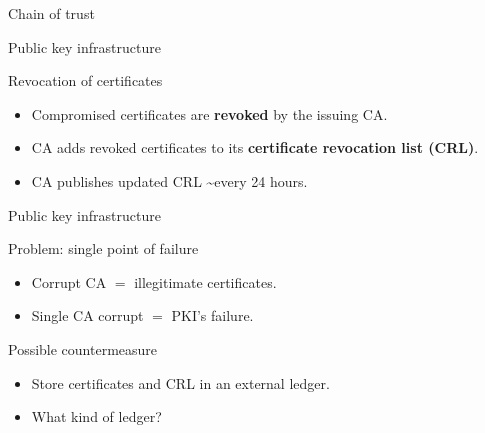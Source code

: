 \begin{frame}{Chain of trust }
\begin{center}
\end{center}
\end{frame}



\begin{frame}{Public key infrastructure}
\begin{exampleblock}{Revocation of certificates}
\begin{itemize}
\item Compromised certificates are
\textbf{revoked} by the issuing CA.
\item CA adds revoked certificates to its
\textbf{certificate revocation list (CRL)}.
\item CA publishes updated CRL
\textasciitilde every 24 hours.
\end{itemize}
\end{exampleblock}
\end{frame}

\begin{frame}{Public key infrastructure}

\begin{alertblock}{Problem: single point of failure}
\begin{itemize}
\item Corrupt CA $=$ illegitimate
certificates.
\item Single CA corrupt $=$ PKI's failure.
\end{itemize}
\end{alertblock}

\pause

\begin{exampleblock}{Possible countermeasure}
\begin{itemize}
\item Store certificates and CRL
in an external ledger.
\item What kind of ledger?
\end{itemize}
\end{exampleblock}

\end{frame}


